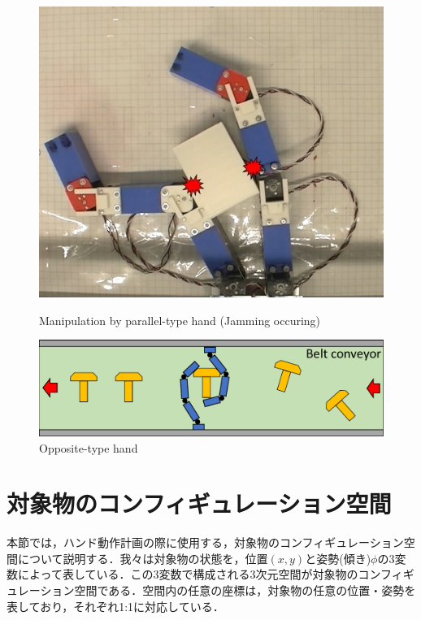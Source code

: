 \documentclass[a4paper,twoside,12pt,papersize, dvipdfmx]{iirthesis}
\begin{document}
\begin{figure}[b]
\begin{minipage}{0.33\hsize}
	\includegraphics[width=0.9\hsize]{fig/2-sensorless-icm/jam3.jpg}
	\label{fig::sicm::stilljam}
	\end{minipage}
	\caption{Manipulation by parallel-type hand (Jamming occuring)}
	\label{fig::sicm::jam}
	

	\centering
	\includegraphics[width=0.9\hsize]{fig/2-sensorless-icm/opposite-type.pdf}
	\caption{Opposite-type hand} \label{fig::sicm::opposite-hand}
\end{figure}

\section{対象物のコンフィギュレーション空間\cite{komiyama2021}}\label{sec::sicm::cspace}
本節では，ハンド動作計画の際に使用する，対象物のコンフィギュレーション空間について説明する．我々は対象物の状態を，位置$(x, y)$と姿勢(傾き)$\phi$の3変数によって表している．この3変数で構成される3次元空間が対象物のコンフィギュレーション空間である．空間内の任意の座標は，対象物の任意の位置・姿勢を表しており，それぞれ1:1に対応している．\par
\end{document}
